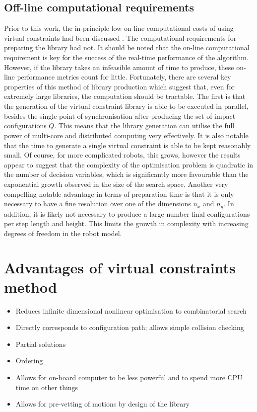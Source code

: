\subsection{Off-line computational requirements}
Prior to this work, the in-principle low on-line computational costs of using virtual constraints had been discussed \cite{manchester13planning}. The computational requirements for preparing the library had not. It should be noted that the on-line computational requirement is key for the success of the real-time performance of the algorithm. However, if the library takes an infeasible amount of time to produce, these on-line performance metrics count for little. Fortunately, there are several key properties of this method of library production which suggest that, even for extremely large libraries, the computation should be tractable. The first is that the generation of the virtual constraint library is able to be executed in parallel, besides the single point of synchronisation after producing the set of impact configurations $\tilde{Q}$. This means that the library generation can utilise the full power of multi-core and distributed computing very effectively. It is also notable that the time to generate a single virtual constraint is able to be kept reasonably small. Of course, for more complicated robots, this grows, however the results appear to suggest that the complexity of the optimisation problem is quadratic in the number of decision variables, which is significantly more favourable than the exponential growth observed in the size of the search space. Another very compelling notable advantage in terms of preparation time is that it is only necessary to have a fine resolution over one of the dimensions $n_x$ and $n_y$. In addition, it is likely not necessary to produce a large number final configurations per step length and height. This limits the growth in complexity with increasing degrees of freedom in the robot model.

\section{Advantages of virtual constraints method}
\begin{itemize}
	\item Reduces infinite dimensional nonlinear optimisation to combinatorial search
	\item Directly corresponds to configuration path; allows simple collision checking
	\item Partial solutions
	\item Ordering
	\item Allows for on-board computer to be less powerful and to spend more CPU time on other things
	\item Allows for pre-vetting of motions by design of the library
\end{itemize}

